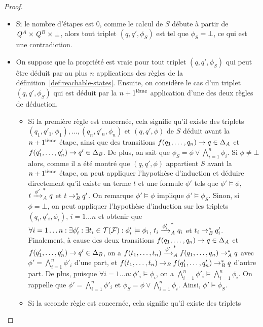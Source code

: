 \begin{proof}
\begin{itemize}
\item Si le nombre d'étapes est $0$, comme le calcul de $S$ débute
  à partir de $\Q^\A \times \Q^\B \times \bot$, alors tout triplet $(q,q',\phi_S)$
  est tel que $\phi_S=\bot$, ce qui est une contradiction.

\item On suppose que la propriété est vraie pour tout triplet $(q,q',\phi_S)$ qui peut être
  déduit par au plus $n$ applications des règles de la définition~\ref{def:reachable-states}.
  Ensuite, on considère le cas d'un triplet $(q,q',\phi_S)$ qui est déduit 
  par la $n+1^\iem$ application d'une des deux règles de déduction.
  \begin{itemize}
  \item Si la première règle est concernée, cela signifie qu'il existe
    des triplets  $(q_1,q'_1, \phi_1),\ldots,(q_n,q'_n,\phi_n)$ et $(q,q',\phi)$ de $S$
    déduit avant la $n+1^\iem$ étape, ainsi que des transitions $f(q_1,\ldots,q_n)\rw q
    \in \Delta_\A$ et $f(q'_1,\ldots,q'_n)\rw q' \in \Delta_\B$. De plus,
    on sait que $\phi_S=\phi \vee \bigwedge_{i=1}^n \phi_i$.
    Si $\phi\neq \bot$ alors, comme il a été montré que $(q,q',\phi)$ appartient $S$
    avant la $n+1^\iem$ étape, on peut appliquer l'hypothèse d'induction et déduire directement
    qu'il existe un terme $t$ et une formule $\phi'$ tels que $\phi'
    \models \phi$, $t \xrw{\phi'}^*_\A q$ et $t \rwB^* q'$. On remarque $\phi'
    \models \phi$ implique $\phi' \models \phi_S$.
    Sinon, si $\phi=\bot$, %
    on peut appliquer l'hypothèse d'induction sur les triplets $(q_i,q'_i,\phi_i)$,
    $i=1\ldots n$ et obtenir que $\forall i=1\ldots n:\exists \phi_i':\exists
    t_i \in\TF: \phi'_i \models \phi_i$, $t_i \xrw{\phi_i'}_\A^* q_i$ et $t_i
    \rwB^* q'_i$. Finalement, 
    à cause des deux transitions $f(q_1,\ldots,q_n)\rw q \in \Delta_\A$ et
    $f(q'_1,\ldots,q'_n)\rw q' \in \Delta_\B$, on a $f(t_1,\ldots,t_n)
    \xrw{\phi'}_\A^* f(q_1,\ldots,q_n) \rwA^* q$ avec
    $\phi'=\bigwedge_{i=1}^n \phi'_i$ d'une part, et $f(t_1,\ldots,t_n) 
    \rwB f(q'_1,\ldots,q'_n) \rwB^* q$ d'autre part. De plus,
    puisque $\forall i=1\ldots n: \phi'_i \models \phi_i$, on a 
    $\bigwedge_{i=1}^n \phi'_i \models \bigwedge_{i=1}^n \phi_i$. On rappelle que
    $\phi'= \bigwedge_{i=1}^n \phi'_i$ et $\phi_S= \phi\vee \bigwedge_{i=1}^n
    \phi_i$. Ainsi, $\phi' \models \phi_S$.
  \item Si la seconde règle est concernée, cela signifie qu'il existe des triplets

\end{itemize}
\end{itemize}
\end{proof}
